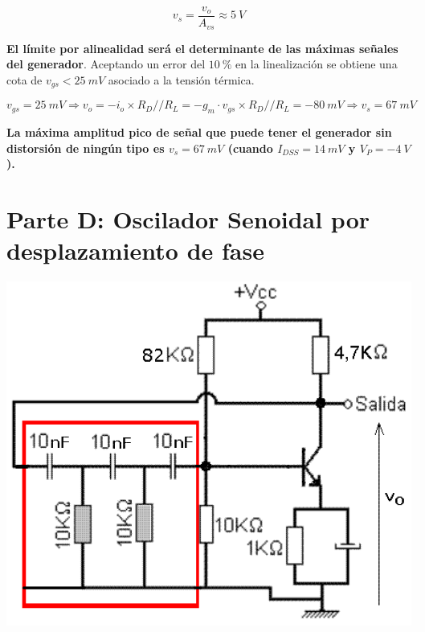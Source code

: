 \begin{multicols}{2}
        \begin{equation}
        	v_s = \frac{v_o}{A_{vs}} \approx 5\ V \nonumber
        	\end{equation}

        \textbf{El límite por alinealidad será el determinante de las máximas señales del generador}. Aceptando un error del $10\ \%$ en la linealización se obtiene una cota de $v_{gs} < 25\ mV$ asociado a la tensión térmica.

        \begin{equation}
        	v_{gs} = 25\ mV \Rightarrow v_o = -i_o\times R_D//R_L = -g_m\cdot v_{gs} \times R_D//R_L = - 80\ mV \Rightarrow v_s = 67\ mV
        	\end{equation}

        \textbf{La máxima amplitud pico de señal que puede tener el generador sin distorsión de ningún tipo es $v_s = 67\ mV$ (cuando $I_{DSS} = 14\ mV$ y $V_P = -4\ V$).}

        \newpage

        \section{Parte D: Oscilador Senoidal por desplazamiento de fase}

        \begin{center}
                   \includegraphics[width=\columnwidth]{oscilador1.png}
                   \label{fig:oscilador}
        \end{center}


\end{multicols}
